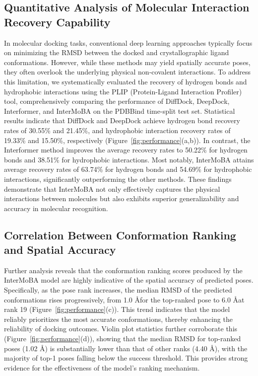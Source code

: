 \documentclass[11pt,a4paper]{article}
\begin{document}
\subsection{Quantitative Analysis of Molecular Interaction Recovery Capability}
In molecular docking tasks, conventional deep learning approaches typically focus on minimizing the RMSD between the docked and crystallographic ligand conformations. However, while these methods may yield spatially accurate poses, they often overlook the underlying physical non-covalent interactions. To address this limitation, we systematically evaluated the recovery of hydrogen bonds and hydrophobic interactions\cite{nemethy1967hydrophobic} using the PLIP (Protein-Ligand Interaction Profiler)\cite{salentin2015plip} tool, comprehensively comparing the performance of DiffDock\cite{corso2022diffdock}, DeepDock\cite{liao2019deepdock}, Interformer\cite{lai2024interformer}, and InterMoBA on the PDBBind\cite{wang2005pdbbind} time-split test set. Statistical results indicate that DiffDock and DeepDock achieve hydrogen bond recovery rates of 30.55\% and 21.45\%, and hydrophobic interaction recovery rates\cite{buttenschoen2024posebusters} of 19.33\% and 15.50\%, respectively (Figure~\ref{fig:performance}(a,b)). In contrast, the Interformer method improves the average recovery rates to 50.22\% for hydrogen bonds and 38.51\% for hydrophobic interactions. Most notably, InterMoBA attains average recovery rates of 63.74\% for hydrogen bonds and 54.69\% for hydrophobic interactions, significantly outperforming the other methods. These findings demonstrate that InterMoBA not only effectively captures the physical interactions between molecules but also exhibits superior generalizability and accuracy in molecular recognition.

\subsection{Correlation Between Conformation Ranking and Spatial Accuracy}
Further analysis reveals that the conformation ranking scores produced by the InterMoBA model are highly indicative of the spatial accuracy of predicted poses. Specifically, as the pose rank increases, the median RMSD of the predicted conformations rises progressively, from 1.0 \AA for the top-ranked pose to 6.0 \AA at rank 19 (Figure~\ref{fig:performance}(c)). This trend indicates that the model reliably prioritizes the most accurate conformations, thereby enhancing the reliability of docking outcomes. Violin plot statistics further corroborate this (Figure~\ref{fig:performance}(d)), showing that the median RMSD for top-ranked poses (1.02 \AA) is substantially lower than that of other ranks (4.40 \AA), with the majority of top-1 poses falling below the success threshold. This provides strong evidence for the effectiveness of the model's ranking mechanism.
\end{document}
